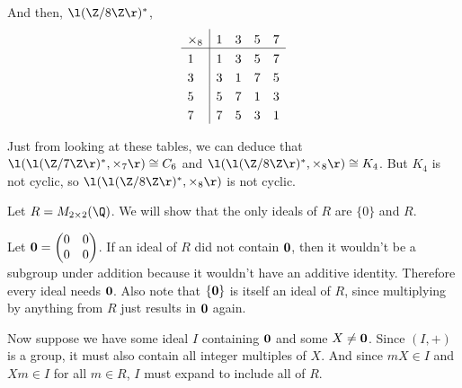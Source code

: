\documentclass[a4paper]{article}
\begin{document}
And then, $\l(\Z / 8\Z\r)^*$,
\[
\setlength{\extrarowheight}{3pt}%
\begin{array}{l|*{7}{l}}
	\times_8 & 1 & 3 & 5 & 7 \\
\hline
	1 & 1 & 3 & 5 & 7 \\
	3 & 3 & 1 & 7 & 5 \\
	5 & 5 & 7 & 1 & 3 \\
	7 & 7 & 5 & 3 & 1 \\
\end{array}
\]

Just from looking at these tables, we can deduce that $\l( \l(\Z / 7 \Z\r)^*, \times_7 \r) \cong C_6$ and $\l( \l(\Z / 8 \Z\r)^*, \times_8 \r) \cong K_4$. But $K_4$ is not cyclic, so $\l( \l(\Z / 8 \Z\r)^*, \times_8 \r)$ is not cyclic.


Let $R = M_{2 \times 2}(\Q)$. We will show that the only ideals of $R$ are $\{0\}$ and $R$.

Let $\bf 0 = \begin{pmatrix}0 & 0\\ 0 & 0\end{pmatrix}$. If an ideal of $R$ did not contain $\bf 0$, then it wouldn't be a subgroup under addition because it wouldn't have an additive identity. Therefore every ideal needs $\bf 0$. Also note that $\{ \bf 0 \}$ is itself an ideal of $R$, since multiplying by anything from $R$ just results in $\bf 0$ again.

Now suppose we have some ideal $I$ containing $\bf 0$ and some $X \ne \bf 0$. Since $(I, +)$ is a group, it must also contain all integer multiples of $X$. And since $mX \in I$ and $Xm \in I$ for all $m \in R$, $I$ must expand to include all of $R$.
\end{document}
